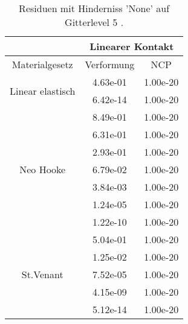 \begin{table} 
\centering 
\begin{tabular}{c|cc|} 
\cline{2-3} 
 & \multicolumn{2}{|c|}{Linearer Kontakt} \\ 
\hline 
\multicolumn{1}{|c|}{Materialgesetz} & \multicolumn{1}{c|}{Verformung} & \multicolumn{1}{c|}{NCP} \\ 
\hline 
\multicolumn{1}{|c|}{\multirow{2}{*}{Linear elastisch}} &\multicolumn{1}{|c|}{  4.63e-01} & \multicolumn{1}{|c|}{  1.00e-20} \\ 
\multicolumn{1}{|c|}{} & \multicolumn{1}{|c|}{  6.42e-14} & \multicolumn{1}{|c|}{  1.00e-20} \\ 
\hline 
\multicolumn{1}{|c|}{\multirow{7}{*}{Neo Hooke}} &\multicolumn{1}{|c|}{  8.49e-01} & \multicolumn{1}{|c|}{  1.00e-20} \\ 
\multicolumn{1}{|c|}{} & \multicolumn{1}{|c|}{  6.31e-01} & \multicolumn{1}{|c|}{  1.00e-20} \\ 
\multicolumn{1}{|c|}{} & \multicolumn{1}{|c|}{  2.93e-01} & \multicolumn{1}{|c|}{  1.00e-20} \\ 
\multicolumn{1}{|c|}{} & \multicolumn{1}{|c|}{  6.79e-02} & \multicolumn{1}{|c|}{  1.00e-20} \\ 
\multicolumn{1}{|c|}{} & \multicolumn{1}{|c|}{  3.84e-03} & \multicolumn{1}{|c|}{  1.00e-20} \\ 
\multicolumn{1}{|c|}{} & \multicolumn{1}{|c|}{  1.24e-05} & \multicolumn{1}{|c|}{  1.00e-20} \\ 
\multicolumn{1}{|c|}{} & \multicolumn{1}{|c|}{  1.22e-10} & \multicolumn{1}{|c|}{  1.00e-20} \\ 
\hline 
\multicolumn{1}{|c|}{\multirow{5}{*}{St.Venant}} &\multicolumn{1}{|c|}{  5.04e-01} & \multicolumn{1}{|c|}{  1.00e-20} \\ 
\multicolumn{1}{|c|}{} & \multicolumn{1}{|c|}{  1.25e-02} & \multicolumn{1}{|c|}{  1.00e-20} \\ 
\multicolumn{1}{|c|}{} & \multicolumn{1}{|c|}{  7.52e-05} & \multicolumn{1}{|c|}{  1.00e-20} \\ 
\multicolumn{1}{|c|}{} & \multicolumn{1}{|c|}{  4.15e-09} & \multicolumn{1}{|c|}{  1.00e-20} \\ 
\multicolumn{1}{|c|}{} & \multicolumn{1}{|c|}{  5.12e-14} & \multicolumn{1}{|c|}{  1.00e-20} \\ 
\hline 
\end{tabular}\caption{Residuen mit Hinderniss 'None' auf Gitterlevel 5 .}\label{tab:Residuum_None_level5}
\end{table} 
